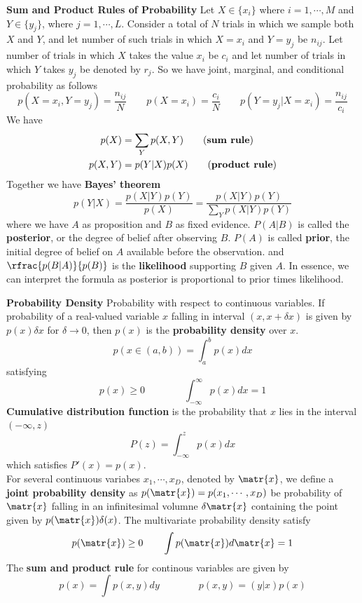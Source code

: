 \documentclass[11pt]{article}
\begin{document}

\begin{defn*}
    \textbf{Sum and Product Rules of Probability} Let $X \in \{x_i\}$ where $i=1,\cdots, M$ and $Y\in \{y_j\}$, where $j=1,\cdots,L$. Consider a total of $N$ trials in which we sample both $X$ and $Y$, and let number of such trials in which $X=x_i$ and $Y=y_j$ be $n_{ij}$. Let number of trials in which $X$ takes the value $x_i$ be $c_i$ and let number of trials in which $Y$ takes $y_j$ be denoted by $r_j$. So we have joint, marginal, and conditional probability as follows 
    \[
        p(X=x_i, Y=y_j) = \frac{n_{ij}}{N}
        \quad \quad 
        p(X=x_i) = \frac{c_i}{N}
        \quad \quad 
        p(Y=y_j | X=x_i) = \frac{n_{ij}}{c_i}    
    \]
    We have 
    \begin{align*}
        p(X) &= \sum_{Y} p(X,Y) \tag{\textbf{sum rule}}\\
        p(X,Y) &= p(Y|X)p(X) \tag{\textbf{product rule}}\\
    \end{align*}
    Together we have \textbf{Bayes' theorem}
    \[
        p(Y|X)
        = \frac{p(X|Y)p(Y)}{p(X)}
        = \frac{p(X|Y)p(Y)}{\sum_Y p(X|Y)p(Y)}
    \]
    where we have $A$ as proposition and $B$ as fixed evidence. $P(A|B)$ is called the \textbf{posterior}, or the degree of belief after observing $B$. $P(A)$ is called \textbf{prior}, the initial degree of belief on $A$ available before the observation. and $\rfrac{p(B|A)}{p(B)}$ is the \textbf{likelihood} supporting $B$ given $A$. In essence, we can interpret the formula as posterior is proportional to prior times likelihood.
\end{defn*}


\begin{defn*}
    \textbf{Probability Density} Probability with respect to continuous variables. If probability of a real-valued variable $x$ falling in interval $(x,x+\delta x)$ is given by $p(x)\delta x$ for $\delta \to 0$, then $p(x)$ is the \textbf{probability density} over $x$. 
    \[
        p(x\in (a,b)) = \int_a^b p(x)dx
    \]
    satisfying 
    \[
        p(x) \geq 0 
        \quad \quad \quad \quad 
        \int_{-\infty}^{\infty} p(x)dx = 1
    \]
    \textbf{Cumulative distribution function} is the probability that $x$ lies in the interval $(-\infty, z)$
    \[
        P(z) = \int_{-\infty}^z p(x)dx    
    \]
    which satisfies $P'(x) = p(x)$. \\
    For several continuous variabes $x_1,\cdots,x_D$, denoted by $\matr{x}$, we define a \textbf{joint probability density} as $p(\matr{x}) = p(x_1,\cdots, x_D)$ be probability of $\matr{x}$ falling in an infinitesimal volumne $\delta \matr{x}$ containing the point given by $p(\matr{x})\delta(x)$. The multivariate probability density satisfy
    \[
        p(\matr{x}) \geq 0
        \quad \quad 
        \int p(\matr{x}) d\matr{x}=  1
    \]
    The \textbf{sum and product rule} for continous variables are given by 
    \[
        p(x) = \int p(x,y) dy    
        \quad \quad \quad \quad 
        p(x,y) = (y|x)p(x)
    \]
\end{defn*}
\end{document}
